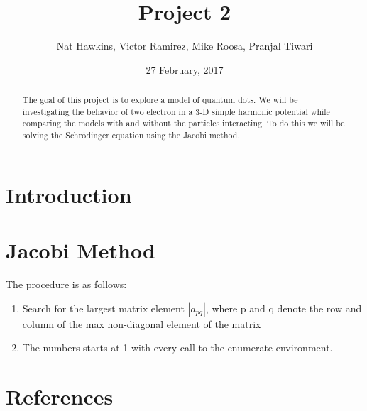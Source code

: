 \documentclass{article}
\title{Project 2}
\author{Nat Hawkins, Victor Ramirez, Mike Roosa, Pranjal Tiwari}
\date{27 February, 2017}
\begin{document}
\maketitle

\begin{abstract}
	The goal of this project is to explore a model of quantum dots. We will be investigating the behavior of two electron in a 3-D simple harmonic potential while comparing the models with and without the particles interacting. To do this we will be solving the Schrödinger equation using the Jacobi method. 
\end{abstract}
\section{Introduction}

\section{Jacobi Method}

The procedure is as follows:

\begin{enumerate}
	\item Search for the largest matrix element $|a_{pq}|$, where p and q denote the row and column of the max non-diagonal element of the matrix
	\item The numbers starts at 1 with every call to the enumerate environment.
\end{enumerate}
\section{References}

\end{document}
